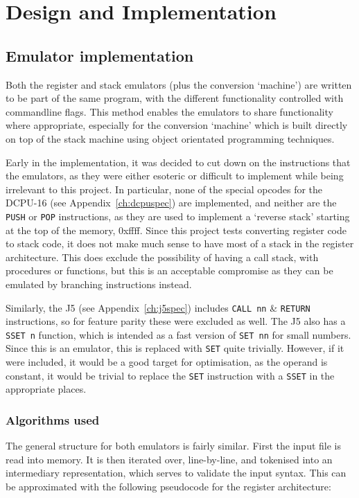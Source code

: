 \chapter{Design and Implementation}\label{ch:designimplementation}

\section{Emulator implementation}
Both the register and stack emulators (plus the conversion `machine') are
written to be part of the same program, with the different functionality
controlled with commandline flags. This method enables the emulators to share
functionality where appropriate, especially for the conversion `machine' which
is built directly on top of the stack machine using object orientated
programming techniques.

Early in the implementation, it was decided to cut down on the instructions that
the emulators, as they were either esoteric or difficult to implement while
being irrelevant to this project. In particular, none of the special opcodes for
the DCPU-16 (see Appendix~\ref{ch:dcpuspec}) are implemented, and neither are
the \texttt{PUSH} or \texttt{POP} instructions, as they are used to implement a
`reverse stack' starting at the top of the memory, 0xffff. Since this project
tests converting register code to stack code, it does not make much sense to
have most of a stack in the register architecture. This does exclude the
possibility of having a call stack, with procedures or functions, but this is an
acceptable compromise as they can be emulated by branching instructions instead.

Similarly, the J5 (see Appendix~\ref{ch:j5spec}) includes \texttt{CALL nn} \&
\texttt{RETURN} instructions, so for feature parity these were excluded as well.
The J5 also has a \texttt{SSET n} function, which is intended as a fast version
of \texttt{SET nn} for small numbers. Since this is an emulator, this is
replaced with \texttt{SET} quite trivially. However, if it were included, it
would be a good target for optimisation, as the operand is constant, it would be
trivial to replace the \texttt{SET} instruction with a \texttt{SSET} in the
appropriate places.

\subsection{Algorithms used}
The general structure for both emulators is fairly similar. First the input
file is read into memory. It is then iterated over, line-by-line, and tokenised
into an intermediary representation, which serves to validate the input syntax.
This can be approximated with the following pseudocode for the register
architecture:


